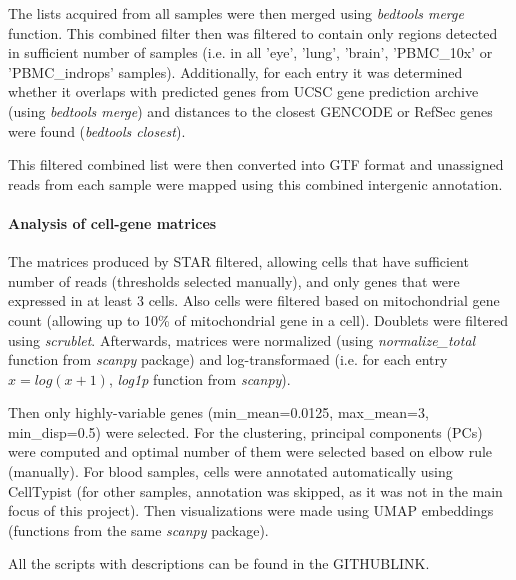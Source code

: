 The lists acquired from all samples were then merged using \textit{bedtools merge} function.
This combined filter then was filtered to contain only regions detected in sufficient number of samples
(i.e. in all 'eye', 'lung', 'brain', 'PBMC\_10x' or 'PBMC\_indrops' samples).
Additionally, for each entry it was determined whether it overlaps with predicted genes from UCSC gene prediction archive
(using \textit{bedtools merge}) and distances to the closest GENCODE or RefSec genes were found (\textit{bedtools closest}).

This filtered combined list were then converted into GTF format and unassigned reads from each sample were mapped using this
combined intergenic annotation.

\paragraph{Analysis of cell-gene matrices}

The matrices produced by STAR filtered, allowing cells that have sufficient number of reads (thresholds selected manually),
and only genes that were expressed in at least 3 cells.
Also cells were filtered based on mitochondrial gene count (allowing up to 10\% of mitochondrial gene in a cell).
Doublets were filtered using \textit{scrublet}.
Afterwards, matrices were normalized (using \textit{normalize\_total} function from \textit{scanpy} package) and log-transformaed
(i.e. for each entry $x = log(x+1)$, \textit{log1p} function from \textit{scanpy}).

Then only highly-variable genes (min\_mean=0.0125, max\_mean=3, min\_disp=0.5) were selected.
For the clustering, principal components (PCs) were computed and optimal number of them were selected based on elbow rule (manually).
For blood samples, cells were annotated automatically using CellTypist
(for other samples, annotation was skipped, as it was not in the main focus of this project).
Then visualizations were made using UMAP embeddings (functions from the same \textit{scanpy} package).

All the scripts with descriptions can be found in the GITHUBLINK.



